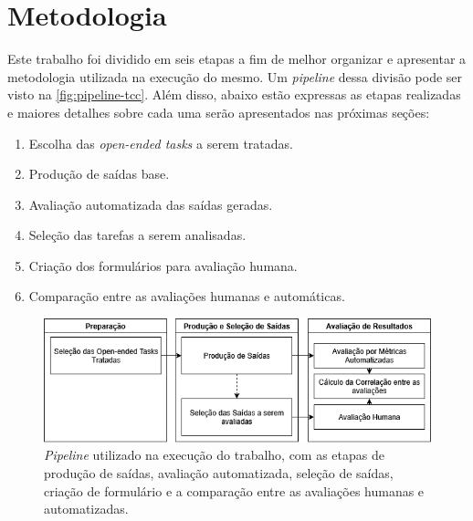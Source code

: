 \documentclass[cic,tc]{iiufrgs}
\begin{document}
\chapter{Metodologia}
\label{cap:metodologia}
Este trabalho foi dividido em seis etapas a fim de melhor organizar e apresentar a metodologia utilizada na execução do mesmo. Um \textit{pipeline} dessa divisão pode ser visto na \autoref{fig:pipeline-tcc}. Além disso, abaixo estão expressas as etapas realizadas e maiores detalhes sobre cada uma serão apresentados nas próximas seções:
\begin{enumerate}
    \item Escolha das \textit{open-ended tasks} a serem tratadas.
    \item Produção de saídas base.%
    \item Avaliação automatizada das saídas geradas.%
    \item Seleção das tarefas a serem analisadas.%
    \item Criação dos formulários para avaliação humana.%
    \item Comparação entre as avaliações humanas e automáticas.%
\end{enumerate}

\begin{figure}[htbp]
    \caption{\textit{Pipeline} utilizado na execução do trabalho, com as etapas de produção de saídas, avaliação automatizada, seleção de saídas, criação de formulário e a comparação entre as avaliações humanas e automatizadas.}
    \begin{center}
    \includegraphics[width=\textwidth]{Figures/Pipeline TCC.png}
    \end{center}
    \label{fig:pipeline-tcc}
\end{figure}
\end{document}
